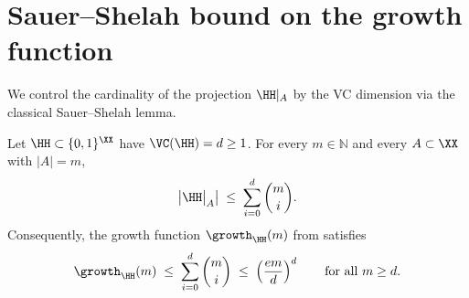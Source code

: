 \section{Sauer--Shelah bound on the growth function}\label{sec:sauer-shelah}

We control the cardinality of the projection $\HH|_A$ by the VC dimension via the classical Sauer--Shelah lemma.

\begin{lemma}\label{lem:sauer-shelah}
Let $\HH \subset \{0,1\}^{\XX}$ have $\VC(\HH) = d \ge 1$. For every $m \in \mathbb{N}$ and every $A \subset \XX$ with $|A| = m$,
\begin{align}\label{eq:sauer-binom}
\bigl| \HH\big|_{A} \bigr| \;\le\; \sum_{i=0}^{d} \binom{m}{i}.
\end{align}
Consequently, the growth function $\growth_{\HH}(m)$ from  satisfies
\begin{align}\label{eq:sauer-emd}
\growth_{\HH}(m) \;\le\; \sum_{i=0}^{d} \binom{m}{i} \;\le\; \left( \frac{e m}{d} \right)^d \qquad \text{for all } m \ge d.
\end{align}
\end{lemma}

